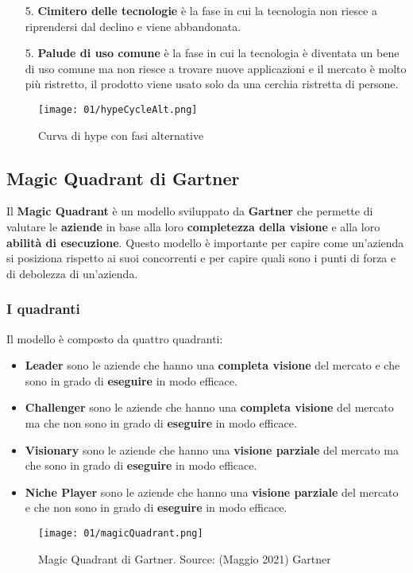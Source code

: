             \begin{enumerate}
                \item[5.] \textbf{Cimitero delle tecnologie} è la fase in cui la tecnologia non riesce a riprendersi dal declino e viene abbandonata.
                \item[5.] \textbf{Palude di uso comune} è la fase in cui la tecnologia è diventata un bene di uso comune ma non riesce a trovare nuove applicazioni e il mercato è molto più ristretto, il prodotto viene usato solo da una cerchia ristretta di persone.
            \end{enumerate}
            \begin{figure}[H]
                \centering
                \texttt{[image: 01/hypeCycleAlt.png]}
                \caption{Curva di hype con fasi alternative}
            \end{figure}
    \subsection{Magic Quadrant di Gartner}
        Il \textbf{Magic Quadrant} è un modello sviluppato da \textbf{Gartner} che permette di valutare le \textbf{aziende} in base alla loro \textbf{completezza della visione} e alla loro \textbf{abilità di esecuzione}. Questo modello è importante per capire come un'azienda si posiziona rispetto ai suoi concorrenti e per capire quali sono i punti di forza e di debolezza di un'azienda.
        \subsubsection{I quadranti} 
            Il modello è composto da quattro quadranti:
            \begin{itemize}
                \item \textbf{Leader} sono le aziende che hanno una \textbf{completa visione} del mercato e che sono in grado di \textbf{eseguire} in modo efficace.
                \item \textbf{Challenger} sono le aziende che hanno una \textbf{completa visione} del mercato ma che non sono in grado di \textbf{eseguire} in modo efficace.
                \item \textbf{Visionary} sono le aziende che hanno una \textbf{visione parziale} del mercato ma che sono in grado di \textbf{eseguire} in modo efficace.
                \item \textbf{Niche Player} sono le aziende che hanno una \textbf{visione parziale} del mercato e che non sono in grado di \textbf{eseguire} in modo efficace.
            \end{itemize}
            \begin{figure}[H]
                \centering
                \texttt{[image: 01/magicQuadrant.png]}
                \caption{Magic Quadrant di Gartner. Source: (Maggio 2021) Gartner}
            \end{figure}
